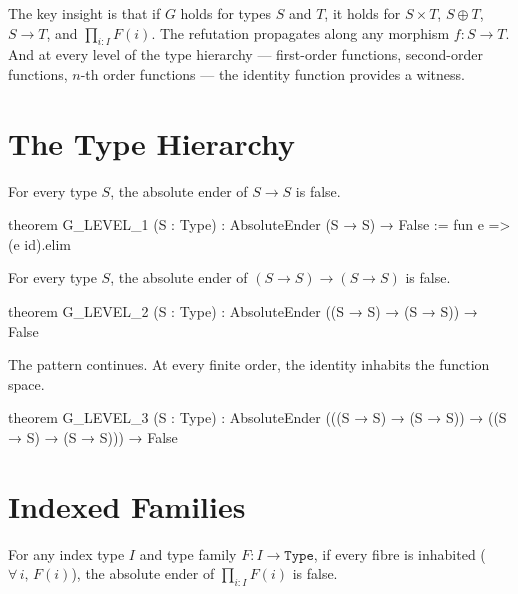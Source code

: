 The key insight is that if $G$ holds for types $S$ and $T$, it holds for $S \times T$, $S \oplus T$, $S \to T$, and $\prod_{i:I} F(i)$. The refutation propagates along any morphism $f : S \to T$. And at every level of the type hierarchy --- first-order functions, second-order functions, $n$-th order functions --- the identity function provides a witness.

\section{The Type Hierarchy}

\begin{theorem}\label{thm:level1}
For every type $S$, the absolute ender of $S \to S$ is false.
\end{theorem}

\begin{leancode}
theorem G_LEVEL_1 (S : Type) :
    AbsoluteEnder (S → S) → False :=
    fun e => (e id).elim
\end{leancode}

\begin{theorem}\label{thm:level2}
For every type $S$, the absolute ender of $(S \to S) \to (S \to S)$ is false.
\end{theorem}

\begin{leancode}
theorem G_LEVEL_2 (S : Type) :
    AbsoluteEnder ((S → S) → (S → S)) → False
\end{leancode}

\begin{theorem}\label{thm:level3}
The pattern continues. At every finite order, the identity inhabits the function space.
\end{theorem}

\begin{leancode}
theorem G_LEVEL_3 (S : Type) :
    AbsoluteEnder (((S → S) → (S → S)) →
                            ((S → S) → (S → S))) → False
\end{leancode}

\section{Indexed Families}

\begin{theorem}\label{thm:indexed}
For any index type $I$ and type family $F : I \to \texttt{Type}$, if every fibre is inhabited ($\forall\, i,\, F(i)$), the absolute ender of $\prod_{i:I} F(i)$ is false.
\end{theorem}


